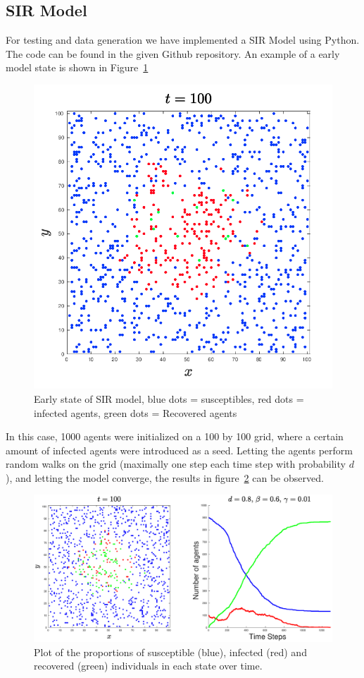 \subsection{SIR Model}

For testing and data generation we have implemented a SIR Model using Python. The code can be found in the given Github repository.\newline
An example of a early model state is shown in Figure~\ref{fig:1}

\begin{figure}[H]
	\centering
	\includegraphics[width=0.4\linewidth]{initial_setup.png}
	\caption{Early state of SIR model, blue dots = susceptibles, red dots = infected agents, green dots = Recovered agents}%
	\label{fig:1}
\end{figure}

In this case, 1000 agents were initialized on a 100 by 100 grid, where a certain amount of infected agents were introduced as a seed. Letting the agents perform random walks on the grid (maximally one step each time step with probability $d$), and letting the model converge, the results in figure~\ref{fig:2} can be observed.

\begin{figure}[H]
	\centering
	\includegraphics[width=0.9\linewidth]{1_1000_agents}
	\caption{Plot of the proportions of susceptible (blue), infected (red) and recovered (green) individuals in each state over time.}%
	\label{fig:2}
\end{figure}

